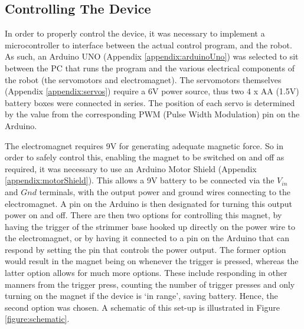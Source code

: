 \documentclass[11pt]{article}
\begin{document}
\pagebreak
\subsection{Controlling The Device}
\label{section:controllingTheDevice}

In order to properly control the device, it was necessary to implement a microcontroller to interface between the actual control program, and the robot. As such, an Arduino UNO (Appendix \ref{appendix:arduinoUno}) was selected to sit between the PC that runs the program and the various electrical components of the robot (the servomotors and electromagnet). The servomotors themselves (Appendix \ref{appendix:servos}) require a 6V power source, thus two 4 x AA (1.5V) battery boxes were connected in series. The position of each servo is determined by the value from the corresponding PWM (Pulse Width Modulation) pin on the Arduino. 

The electromagnet requires 9V for generating adequate magnetic force. So in order to safely control this, enabling the magnet to be switched on and off as required, it was necessary to use an Arduino Motor Shield (Appendix \ref{appendix:motorShield}). This allows a 9V battery to be connected via the $V_{in}$ and $Gnd$ terminals, with the output power and ground wires connecting to the electromagnet. A pin on the Arduino is then designated for turning this output power on and off. There are then two options for controlling this magnet, by having the trigger of the strimmer base hooked up directly on the power wire to the electromagnet, or by having it connected to a pin on the Arduino that can respond by setting the pin that controls the power output. The former option would result in the magnet being on whenever the trigger is pressed, whereas the latter option allows for much more options. These include responding in other manners from the trigger press, counting the number of trigger presses and only turning on the magnet if the device is `in range', saving battery. Hence, the second option was chosen. A schematic of this set-up is illustrated in Figure \ref{figure:schematic}.
\end{document}
